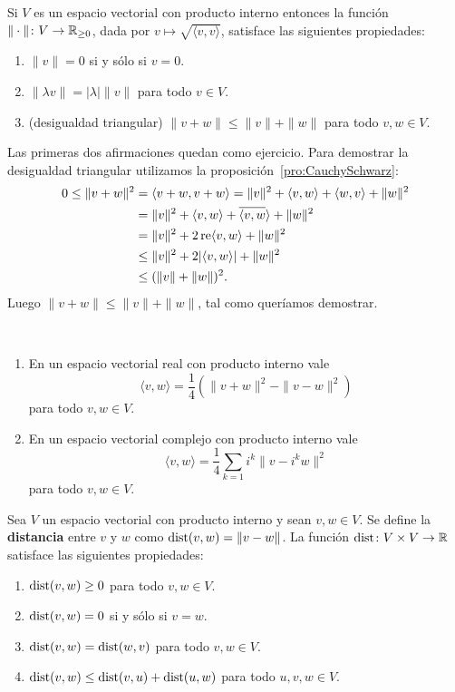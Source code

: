 \begin{block}
    Si $V$ es un espacio vectorial con producto interno entonces la función
    $\|\cdot\|\colon V\to\mathbb{R}_{\geq0}$, dada por $v\mapsto \sqrt{\langle
    v,v\rangle}$, satisface las siguientes propiedades:
    \begin{enumerate}
        \item $\|v\|=0$ si y sólo si $v=0$.
        \item $\|\lambda v\|=|\lambda|\|v\|$ para todo $v\in V$.
        \item (desigualdad triangular) $\|v+w\|\leq\|v\|+\|w\|$ para todo $v,w\in V$. 
    \end{enumerate}

	Las primeras dos afirmaciones quedan como ejercicio. Para demostrar la
	desigualdad triangular utilizamos la proposición~\ref{pro:CauchySchwarz}:
    \begin{align*}
        0\leq\|v+w\|^2&=\langle v+w,v+w\rangle=\|v\|^2+\langle v,w\rangle+\langle w,v\rangle+\|w\|^2\\
        &=\|v\|^2+\langle v,w\rangle+\overline{\langle v,w}\rangle+\|w\|^2\\
        &=\|v\|^2+2\operatorname{re}\langle v,w\rangle+\|w\|^2\\
        &\leq\|v\|^2+2|\langle v,w\rangle|+\|w\|^2\\
		&\leq (\|v\|+\|w\|)^2.
    \end{align*}
	Luego $\|v+w\|\leq\|v\|+\|w\|$, tal como queríamos demostrar. 
\end{block}

\begin{xca}\
    \begin{enumerate}
        \item En un espacio vectorial real con producto interno vale 
            \[
                \langle v,w\rangle=\frac14\left(\|v+w\|^2-\|v-w\|^2\right)
            \]
            para todo $v,w\in V$.
        \item En un espacio vectorial complejo con producto interno vale 
            \[
            \langle v,w\rangle=\frac14\sum_{k=1}i^k\|v-i^kw\|^2
            \]
            para todo $v,w\in V$.
    \end{enumerate}
\end{xca}

\begin{block}
	Sea $V$ un espacio vectorial con producto interno y sean $v,w\in V$. Se
	define la \textbf{distancia} entre $v$ y $w$ como $\operatorname{dist}(v,w)=\|v-w\|$. La
	función $\operatorname{dist}\colon V\times V\to\mathbb{R}$ satisface las siguientes propiedades:
	\begin{enumerate}
		\item $\operatorname{dist}(v,w)\geq0$ para todo $v,w\in V$.
		\item $\operatorname{dist}(v,w)=0$ si y sólo si $v=w$.
		\item $\operatorname{dist}(v,w)=\operatorname{dist}(w,v)$ para todo $v,w\in V$.
		\item $\operatorname{dist}(v,w)\leq\operatorname{dist}(v,u)+\operatorname{dist}(u,w)$ para todo $u,v,w\in V$. 
	\end{enumerate}
\end{block}

